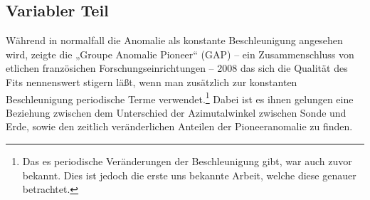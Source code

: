 
\subsection{Variabler Teil}
Während in normalfall die Anomalie als konstante Beschleunigung angesehen wird, zeigte die „Groupe Anomalie Pioneer“ (GAP) –
ein Zusammenschluss von etlichen französichen Forschungseinrichtungen – 2008 das sich die Qualität des Fits nennenswert stigern läßt,
wenn man zusätzlich zur konstanten Beschleunigung periodische Terme verwendet.\footnote{Das es periodische Veränderungen der Beschleunigung gibt,
war auch zuvor bekannt. Dies ist jedoch die erste uns bekannte Arbeit, welche diese genauer betrachtet.} Dabei ist es ihnen gelungen eine
Beziehung zwischen dem Unterschied der Azimutalwinkel zwischen Sonde und Erde, sowie den zeitlich veränderlichen Anteilen der Pioneeranomalie zu finden. %
